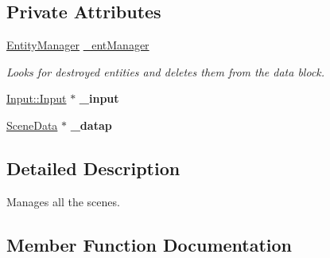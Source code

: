 \subsection*{Private Attributes}
\begin{DoxyCompactItemize}
\item 
\hyperlink{class_ensum_1_1_components_1_1_entity_manager}{Entity\+Manager} \hyperlink{class_ensum_1_1_components_1_1_scene_manager_a1be3bed380d7f6712e9c6c3bb71c048a}{\+\_\+ent\+Manager}\hypertarget{class_ensum_1_1_components_1_1_scene_manager_a1be3bed380d7f6712e9c6c3bb71c048a}{}\label{class_ensum_1_1_components_1_1_scene_manager_a1be3bed380d7f6712e9c6c3bb71c048a}

\begin{DoxyCompactList}\small\item\em Looks for destroyed entities and deletes them from the data block. \end{DoxyCompactList}\item 
\hyperlink{class_ensum_1_1_input_1_1_input}{Input\+::\+Input} $\ast$ {\bfseries \+\_\+input}\hypertarget{class_ensum_1_1_components_1_1_scene_manager_a997e4d367f66c9f80d27e027999f6802}{}\label{class_ensum_1_1_components_1_1_scene_manager_a997e4d367f66c9f80d27e027999f6802}

\item 
\hyperlink{struct_ensum_1_1_components_1_1_scene_manager_1_1_scene_data}{Scene\+Data} $\ast$ {\bfseries \+\_\+datap}\hypertarget{class_ensum_1_1_components_1_1_scene_manager_a249b282fedd2971d521e5a4a8922ceeb}{}\label{class_ensum_1_1_components_1_1_scene_manager_a249b282fedd2971d521e5a4a8922ceeb}

\end{DoxyCompactItemize}


\subsection{Detailed Description}
Manages all the scenes. 

\subsection{Member Function Documentation}
